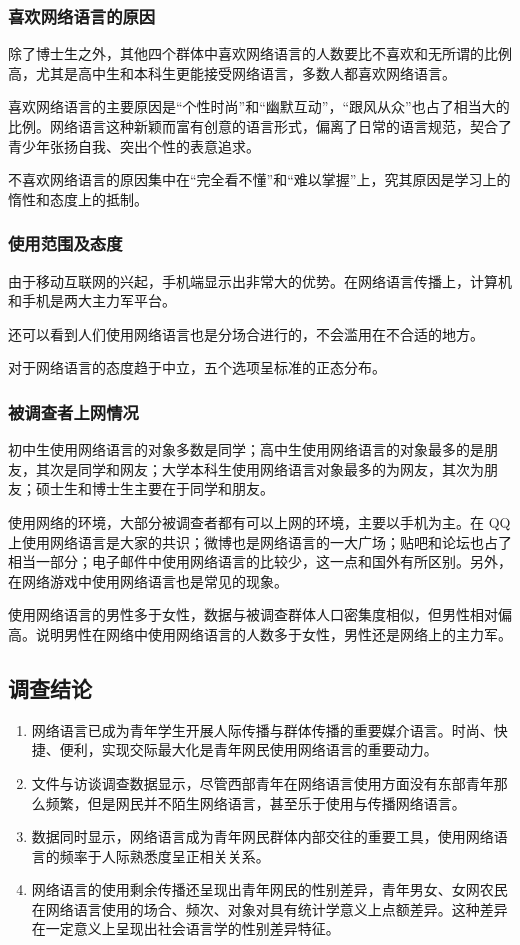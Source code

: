 \subsubsection{喜欢网络语言的原因}

除了博士生之外，其他四个群体中喜欢网络语言的人数要比不喜欢和无所谓的比例高，尤其是高中生和本科生更能接受网络语言，多数人都喜欢网络语言。

喜欢网络语言的主要原因是“个性时尚”和“幽默互动”，“跟风从众”也占了相当大的比例。网络语言这种新颖而富有创意的语言形式，偏离了日常的语言规范，契合了青少年张扬自我、突出个性的表意追求。

不喜欢网络语言的原因集中在“完全看不懂”和“难以掌握”上，究其原因是学习上的惰性和态度上的抵制。

\subsubsection{使用范围及态度}

由于移动互联网的兴起，手机端显示出非常大的优势。在网络语言传播上，计算机和手机是两大主力军平台。

还可以看到人们使用网络语言也是分场合进行的，不会滥用在不合适的地方。

对于网络语言的态度趋于中立，五个选项呈标准的正态分布。

\subsubsection{被调查者上网情况}

初中生使用网络语言的对象多数是同学；高中生使用网络语言的对象最多的是朋友，其次是同学和网友；大学本科生使用网络语言对象最多的为网友，其次为朋友；硕士生和博士生主要在于同学和朋友。

使用网络的环境，大部分被调查者都有可以上网的环境，主要以手机为主。在 QQ 上使用网络语言是大家的共识；微博也是网络语言的一大广场；贴吧和论坛也占了相当一部分；电子邮件中使用网络语言的比较少，这一点和国外有所区别。另外，在网络游戏中使用网络语言也是常见的现象。

使用网络语言的男性多于女性，数据与被调查群体人口密集度相似，但男性相对偏高。说明男性在网络中使用网络语言的人数多于女性，男性还是网络上的主力军。

\subsection{调查结论}

\begin{enumerate}
\item 网络语言已成为青年学生开展人际传播与群体传播的重要媒介语言。时尚、快捷、便利，实现交际最大化是青年网民使用网络语言的重要动力。
\item 文件与访谈调查数据显示，尽管西部青年在网络语言使用方面没有东部青年那么频繁，但是网民并不陌生网络语言，甚至乐于使用与传播网络语言。
\item 数据同时显示，网络语言成为青年网民群体内部交往的重要工具，使用网络语言的频率于人际熟悉度呈正相关关系。
\item 网络语言的使用剩余传播还呈现出青年网民的性别差异，青年男女、女网农民在网络语言使用的场合、频次、对象对具有统计学意义上点额差异。这种差异在一定意义上呈现出社会语言学的性别差异特征。
\end{enumerate}

